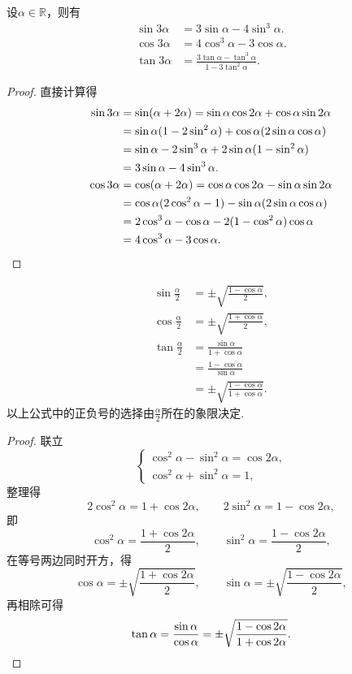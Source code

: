 \begin{proposition}
设\(\alpha\in\mathbb{R}\)，则有\begin{align}
	\sin3\alpha &= 3 \sin\alpha - 4 \sin^3\alpha. \\
	\cos3\alpha &= 4 \cos^3\alpha - 3 \cos\alpha. \\
	\tan3\alpha &= \frac{3 \tan\alpha - \tan^3\alpha}{1 - 3\tan^2\alpha}.
\end{align}
\begin{proof}
直接计算得\begin{align*}
	\sin3\alpha &= \sin(\alpha+2\alpha)
	= \sin\alpha\cos2\alpha + \cos\alpha\sin2\alpha \\
	&= \sin\alpha(1-2\sin^2\alpha)
		+ \cos\alpha(2\sin\alpha\cos\alpha) \\
	&= \sin\alpha-2\sin^3\alpha
		+ 2\sin\alpha(1-\sin^2\alpha) \\
	&= 3\sin\alpha-4\sin^3\alpha. \\
	\cos3\alpha &= \cos(\alpha+2\alpha)
	= \cos\alpha\cos2\alpha - \sin\alpha\sin2\alpha \\
	&= \cos\alpha(2\cos^2\alpha-1) - \sin\alpha(2\sin\alpha\cos\alpha) \\
	&= 2\cos^3\alpha - \cos\alpha
		- 2(1-\cos^2\alpha)\cos\alpha \\
	&= 4\cos^3\alpha - 3\cos\alpha.
	\qedhere
\end{align*}
\end{proof}
\end{proposition}

\begin{proposition}[半倍角公式]
\begin{align}
	\sin\frac\alpha2 &= \pm \sqrt{\frac{1 - \cos\alpha}{2}},
		\label{equation:三角函数.正弦的半倍角公式} \\
	\cos\frac\alpha2 &= \pm \sqrt{\frac{1 + \cos\alpha}{2}}, \\
	\tan\frac\alpha2
	&= \frac{\sin\alpha}{1+\cos\alpha} \\
	&= \frac{1-\cos\alpha}{\sin\alpha} \\
	&= \pm \sqrt{\frac{1 - \cos\alpha}{1 + \cos\alpha}}.
\end{align}
以上公式中的正负号的选择由\(\frac\alpha2\)所在的象限决定.
\begin{proof}
联立\[
	\left\{ \begin{array}{l}
		\cos^2\alpha - \sin^2\alpha = \cos 2\alpha, \\
		\cos^2\alpha + \sin^2\alpha = 1,
	\end{array} \right.
\]
整理得\[
	2\cos^2\alpha=1+\cos2\alpha, \qquad
	2\sin^2\alpha=1-\cos2\alpha,
\]
即\[
	\cos^2\alpha=\frac{1+\cos2\alpha}{2}, \qquad
	\sin^2\alpha=\frac{1-\cos2\alpha}{2},
\]
在等号两边同时开方，得\[
	\cos\alpha = \pm\sqrt{\frac{1+\cos2\alpha}{2}}, \qquad
	\sin\alpha = \pm\sqrt{\frac{1-\cos2\alpha}{2}},
\]
再相除可得\[
	\tan\alpha = \frac{\sin\alpha}{\cos\alpha}
	= \pm \sqrt{\frac{1 - \cos2\alpha}{1 + \cos2\alpha}}.
	\qedhere
\]
\end{proof}
\end{proposition}

